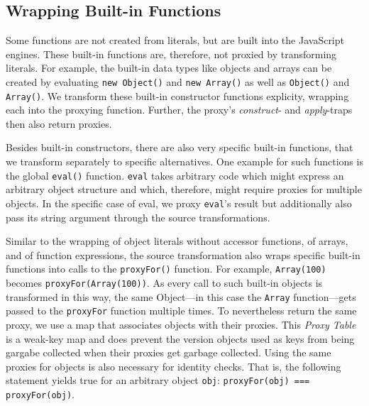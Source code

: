 \subsection{Wrapping Built-in Functions}

Some functions are not created from literals, but are built into the JavaScript engines.
These built-in functions are, therefore, not proxied by transforming literals.
For example, the built-in data types like objects and arrays can be created by evaluating \lstinline{new Object()} and \lstinline{new Array()} as well as \lstinline{Object()} and \lstinline{Array()}.
We transform these built-in constructor functions explicity, wrapping each into the proxying function.
Further, the proxy's \emph{construct}- and \emph{apply}-traps then also return proxies.

Besides built-in constructors, there are also very specific built-in functions, that we transform separately to specific alternatives.
One example for such functions is the global \lstinline{eval()} function.
\lstinline{eval} takes arbitrary code which might express an arbitrary object structure and which, therefore, might require proxies for multiple objects.
In the specific case of eval, we proxy \lstinline{eval}'s result but additionally also pass its string argument through the source transformations.

Similar to the wrapping of object literals without accessor functions, of arrays, and of function expressions, the source transformation also wraps specific built-in functions into calls to the \lstinline{proxyFor()} function.
For example, \lstinline{Array(100)} becomes \lstinline{proxyFor(Array(100))}.
As every call to such built-in objects is transformed in this way, the same Object---in this case the \lstinline{Array} function---gets passed to the \lstinline{proxyFor} function multiple times.
To nevertheless return the same proxy, we use a map that associates objects with their proxies.
This \emph{Proxy Table} is a weak-key map and does prevent the version objects used as keys from being gargabe collected when their proxies get garbage collected.
Using the same proxies for objects is also necessary for identity checks.
That is, the following statement yields true for an arbitrary object \lstinline{obj}: \lstinline{proxyFor(obj) === proxyFor(obj)}.



